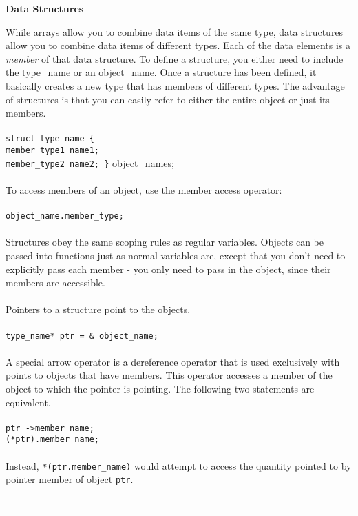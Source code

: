 \documentclass[10pt]{article}
\begin{document}
\begin{centering}
\color{blue}\textbf{Data Structures}\color{black}
\end{centering}
\begin{flushleft}\justify
While arrays allow you to combine data items of the same type, data structures allow you to combine data items of different types. Each of the data elements is a \textit{member} of that data structure. To define a structure, you either need to include the type\_name or an object\_name. Once a structure has been defined, it basically creates a new type that has members of different types. The advantage of structures is that you can easily refer to either the entire object or just its members.\\
\\
\color{red}\texttt{struct type\_name \{}\color{black}\\
\color{red}\quad\texttt{member\_type1 name1;}\color{black}\\
\color{red}\quad\texttt{member\_type2 name2; \}} object\_names;\color{black}\\
\\
To access members of an object, use the member access operator:\\
\\
\color{red}\texttt{object\_name.member\_type;}\color{black}\\
\\
Structures obey the same scoping rules as regular variables. Objects can be passed into functions just as normal variables are, except that you don't need to explicitly pass each member - you only need to pass in the object, since their members are accessible.\\
\\
Pointers to a structure point to the objects.\\
\\
\color{red}\texttt{type\_name* ptr = \& object\_name;}\color{black}\\
\\
A special arrow operator is a dereference operator that is used exclusively with points to objects that have members. This operator accesses a member of the object to which the pointer is pointing. The following two statements are equivalent.\\
\\
\color{red}\texttt{ptr -\textgreater member\_name;}\color{black}\\
\color{red}\texttt{(*ptr).member\_name;}\color{black}\\
\\
Instead, \texttt{*(ptr.member\_name)} would attempt to access the quantity pointed to by pointer member of object \texttt{ptr}.\\
\\
\newline
\noindent\rule{16.5cm}{0.4pt}
\end{flushleft}
\end{document}
